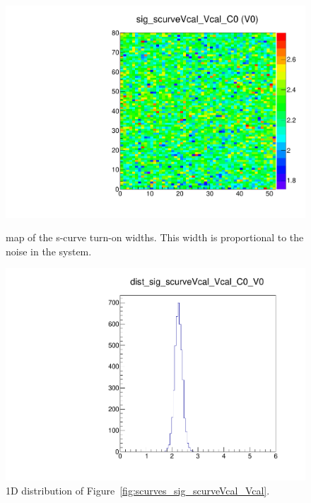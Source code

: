 \begin{figure}[!htp]
\centering
\begin{minipage}{0.45\textwidth}
  \includegraphics[width=1.0\textwidth]{figures/scurves_sig_scurveVcal_Vcal.pdf}
  \caption{\roc map of the \vcal s-curve turn-on widths.  
  This width is proportional to the noise in the system.}
  \label{fig:scurves_sig_scurveVcal_Vcal}
\end{minipage}
\hspace{0.3cm}
\begin{minipage}{0.45\textwidth}
  \includegraphics[width=1.0\textwidth]{figures/scurves_dist_sig_scurveVcal_Vcal.pdf}
  \caption{1D distribution of Figure~\ref{fig:scurves_sig_scurveVcal_Vcal}.}
  \label{fig:scurves_dist_sig_scurveVcal_Vcal}
\end{minipage}
\end{figure}

